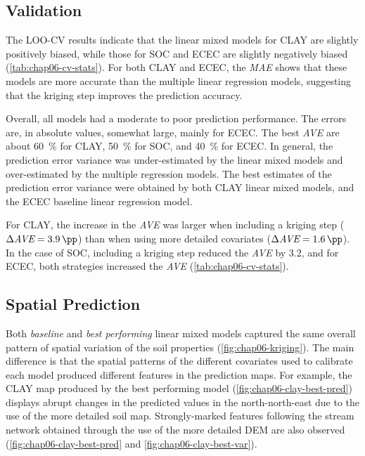 \subsection{Validation}

The LOO-CV results indicate that the linear mixed models for CLAY are slightly positively biased, while 
those for SOC and ECEC are slightly negatively biased (\autoref{tab:chap06-cv-stats}). For both CLAY and ECEC, 
the \textit{MAE} shows that these models are more accurate than the multiple linear regression models, 
suggesting that the kriging step improves the prediction accuracy.



Overall, all models had a moderate to poor prediction performance. The errors are, in absolute values, 
somewhat large, mainly for ECEC. The best \textit{AVE} are about \SI{60}{\percent} for CLAY, \SI{50}{\percent} 
for SOC, and \SI{40}{\percent} for ECEC. In general, the prediction error variance was under-estimated by the 
linear mixed models and over-estimated by the multiple regression models. The best estimates of the prediction 
error variance were obtained by both CLAY linear mixed models, and the ECEC baseline linear regression model.

For CLAY, the increase in the \textit{AVE} was larger when including a kriging step ($\Delta\textit{AVE} = 
\SI{3.9}{\pp}$) than when using more detailed covariates ($\Delta\textit{AVE} = \SI{1.6}{\pp}$). In the case 
of SOC, including a kriging step reduced the \textit{AVE} by \SI{3.2}{\pp}, and for ECEC, both strategies 
increased the \textit{AVE} (\autoref{tab:chap06-cv-stats}).

\subsection{Spatial Prediction}

Both \emph{baseline} and \emph{best performing} linear mixed models captured the same overall pattern of 
spatial variation of the soil properties (\autoref{fig:chap06-kriging}). The main difference is that the 
spatial patterns of the different covariates used to calibrate each model produced different features in the 
prediction maps. For example, the CLAY map produced by the best performing model 
(\autoref{fig:chap06-clay-best-pred}) displays abrupt changes in the predicted values in the north-north-east 
due to the use of the more detailed soil map. Strongly-marked features following the stream network obtained 
through the use of the more detailed DEM are also observed (\autoref{fig:chap06-clay-best-pred} and 
\autoref{fig:chap06-clay-best-var}).

